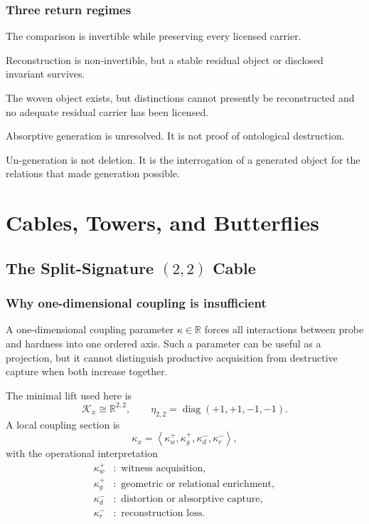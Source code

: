 \documentclass[12pt,openany]{book}
\theoremstyle{remark}
\newcommand{\typedtuple}[1]{\left\langle #1 \right\rangle}
\begin{document}
\section{Three return regimes}
\begin{description}[style=nextline,leftmargin=4.2cm,labelwidth=3.8cm,labelsep=0.35cm]
\item[Faithful return.] The comparison is invertible while preserving every licensed carrier.
\item[Transformative return.] Reconstruction is non-invertible, but a stable residual object or disclosed invariant survives.
\item[Absorptive generation.] The woven object exists, but distinctions cannot presently be reconstructed and no adequate residual carrier has been licensed.
\end{description}

Absorptive generation is unresolved. It is not proof of ontological destruction.

\begin{invariantbox}
Un-generation is not deletion. It is the interrogation of a generated object for the relations that made generation possible.
\end{invariantbox}

\part{Cables, Towers, and Butterflies}

\chapter{The Split-Signature \texorpdfstring{$(2,2)$}{(2,2)} Cable}
\label{ch:22-cable}

\section{Why one-dimensional coupling is insufficient}
A one-dimensional coupling parameter $\kappa\in\mathbb R$ forces all interactions between probe and hardness into one ordered axis. Such a parameter can be useful as a projection, but it cannot distinguish productive acquisition from destructive capture when both increase together.

The minimal lift used here is
\[
\mathcal K_x\cong\mathbb R^{2,2},
\qquad
\eta_{2,2}=\operatorname{diag}(+1,+1,-1,-1).
\]
A local coupling section is
\[
\kappa_x=
\typedtuple{
\kappa_w^+,
\kappa_g^+,
\kappa_d^-,
\kappa_r^-
},
\]
with the operational interpretation
\[
\begin{aligned}
\kappa_w^+&:\text{ witness acquisition},\\
\kappa_g^+&:\text{ geometric or relational enrichment},\\
\kappa_d^-&:\text{ distortion or absorptive capture},\\
\kappa_r^-&:\text{ reconstruction loss}.
\end{aligned}
\]
\end{document}
